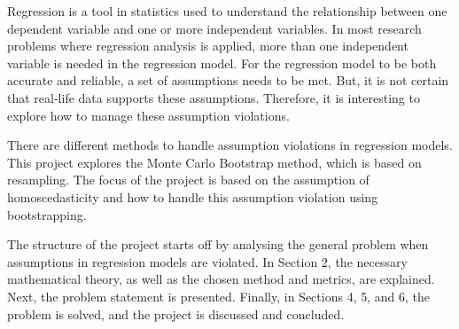 
Regression is a tool in statistics used to understand the relationship between one dependent variable and one or more independent variables. In most research problems where regression analysis is applied, more than one independent variable is needed in the regression model. For the regression model to be both accurate and reliable, a set of assumptions needs to be met. But, it is not certain that real-life data supports these assumptions. Therefore, it is interesting to explore how to manage these assumption violations. \newline

\noindent There are different methods to handle assumption violations in regression models. This project explores the  Monte Carlo Bootstrap method, which is based on resampling. The focus of the project is based on the assumption of homoscedasticity and how to handle this assumption violation using bootstrapping.\newline

\noindent The structure of the project starts off by analysing the general problem when assumptions in regression models are violated. In Section 2, the necessary mathematical theory, as well as the chosen method and metrics, are explained. Next, the problem statement is presented. Finally, in Sections 4, 5, and 6, the problem is solved, and the project is discussed and concluded.